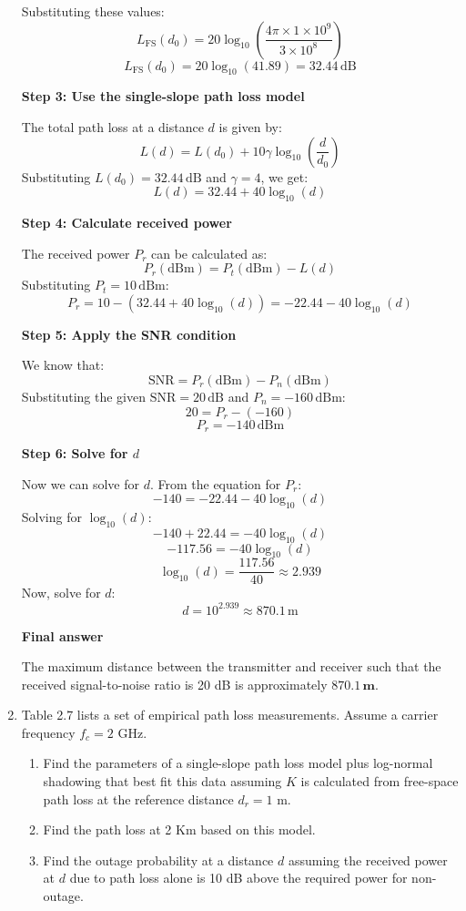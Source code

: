 \documentclass[a4paper,12pt]{book}
\begin{document}
\begin{enumerate}
		Substituting these values:
		\[
		L_{\text{FS}}(d_0) = 20 \log_{10} \left( \frac{4 \pi \times 1 \times 10^9}{3 \times 10^8} \right)
		\]
		\[
		L_{\text{FS}}(d_0) = 20 \log_{10}(41.89) = 32.44 \, \text{dB}
		\]
		
		\textbf{Step 3: Use the single-slope path loss model}\newline
		
		The total path loss at a distance \( d \) is given by:
		\[
		L(d) = L(d_0) + 10 \gamma \log_{10} \left( \frac{d}{d_0} \right)
		\]
		Substituting \( L(d_0) = 32.44 \, \text{dB} \) and \( \gamma = 4 \), we get:
		\[
		L(d) = 32.44 + 40 \log_{10}(d)
		\]
		
		\textbf{Step 4: Calculate received power}
		
		The received power \( P_r \) can be calculated as:
		\[
		P_r (\text{dBm}) = P_t (\text{dBm}) - L(d)
		\]
		Substituting \( P_t = 10 \, \text{dBm} \):
		\[
		P_r = 10 - (32.44 + 40 \log_{10}(d)) = -22.44 - 40 \log_{10}(d)
		\]
		
		\textbf{Step 5: Apply the SNR condition}
		
		We know that:
		\[
		\text{SNR} = P_r (\text{dBm}) - P_n (\text{dBm})
		\]
		Substituting the given \( \text{SNR} = 20 \, \text{dB} \) and \( P_n = -160 \, \text{dBm} \):
		\[
		20 = P_r - (-160)
		\]
		\[
		P_r = -140 \, \text{dBm}
		\]
		
		\textbf{Step 6: Solve for \( d \)}
		
		Now we can solve for \( d \). From the equation for \( P_r \):
		\[
		-140 = -22.44 - 40 \log_{10}(d)
		\]
		Solving for \( \log_{10}(d) \):
		\[
		-140 + 22.44 = -40 \log_{10}(d)
		\]
		\[
		-117.56 = -40 \log_{10}(d)
		\]
		\[
		\log_{10}(d) = \frac{117.56}{40} \approx 2.939
		\]
		Now, solve for \( d \):
		\[
		d = 10^{2.939} \approx 870.1 \, \text{m}
		\]
		
		\textbf{Final answer}
		
		The maximum distance between the transmitter and receiver such that the received signal-to-noise ratio is 20 dB is approximately \( \mathbf{870.1 \, \text{m}} \).
		
		\item Table 2.7 lists a set of empirical path loss measurements. Assume a carrier frequency $f_c = 2$ GHz.
		
		\begin{enumerate}
			\item Find the parameters of a single-slope path loss model plus log-normal shadowing that best fit this data assuming $K$ is calculated from free-space path loss at the reference distance $d_r = 1$ m.
			
			\item Find the path loss at 2 Km based on this model.
			
			\item Find the outage probability at a distance $d$ assuming the received power at $d$ due to path loss alone is 10 dB above the required power for non-outage.
		\end{enumerate}
	\end{enumerate}
	
\end{document}
